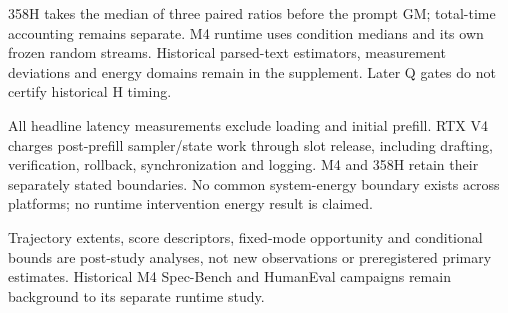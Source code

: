 358H takes the median of three paired ratios before the prompt GM; total-time accounting remains separate. M4 runtime uses condition medians and its own frozen random streams. Historical parsed-text estimators, measurement deviations and energy domains remain in the supplement. Later Q gates do not certify historical H timing.

All headline latency measurements exclude loading and initial prefill. RTX V4 charges post-prefill sampler/state work through slot release, including drafting, verification, rollback, synchronization and logging. M4 and 358H retain their separately stated boundaries. No common system-energy boundary exists across platforms; no runtime intervention energy result is claimed.

Trajectory extents, score descriptors, fixed-mode opportunity and conditional bounds are post-study analyses, not new observations or preregistered primary estimates. Historical M4 Spec-Bench \citep{specbench} and HumanEval \citep{humaneval} campaigns remain background to its separate runtime study.
